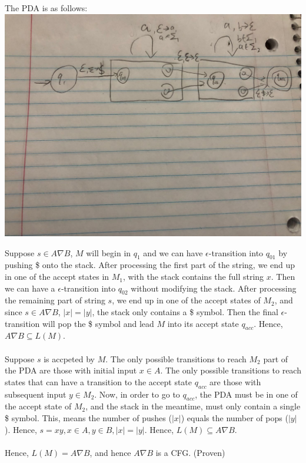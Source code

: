\documentclass[letterpaper, 12pt]{article}
\theoremstyle{definition}
\numberwithin{equation}{section}
\begin{document}
The PDA is as follows: \\
\includegraphics[scale=0.2]{PDA_1}

Suppose $s \in A\nabla B$, $M$ will begin in $q_1$ and we can have $\epsilon$-transition into $q_{01}$ by pushing  \$ onto the stack. After processing the first part of the string, we end up in one of the accept states in $M_1$, with the stack contains the full string $x$. Then we can have a $\epsilon$-transition into $q_{02}$ without modifying the stack. After processing the remaining part of string $s$, we end up in one of the accept states of $M_2$, and since $s \in A\nabla B$, $|x| = |y|$, the stack only contains a \$ symbol. Then the final $\epsilon$-transition will pop the \$ symbol and lead $M$ into its accept state $q_{acc}$. Hence, $A\nabla B \subseteq L(M)$. \\~\\

Suppose $s$ is accpeted by $M$. The only possible transitions to reach $M_2$ part of the PDA are those with initial input $x \in A$. The only possible transitions to reach states that can have a transition to the accept state $q_{acc}$ are those with subsequent input $y \in M_2$. Now, in order to go to $q_{acc}$, the PDA must be in one of the accept state of $M_2$, and the stack in the meantime, must only contain a single \$ symbol. This, means the number of pushes ($|x|$) equals the number of pops ($|y|$). Hence, $s = xy, x \in A, y \in B, |x| = |y|$. Hence, $L(M) \subseteq A \nabla B$.\\~\\

Hence, $L(M) = A \nabla B$, and hence $A \nabla B$ is a CFG. (Proven)
\end{document}
